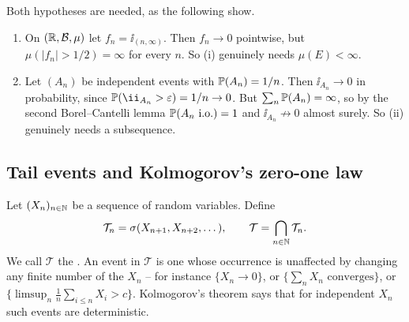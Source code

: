 \documentclass[a4paper]{scrartcl}
\newcommand{\cB}{\mathcal{B}}
\newcommand{\cT}{\mathcal{T}}
\newcommand{\ind}{\ii}
\begin{document}
Both hypotheses are needed, as the following show.

\begin{example}
	\begin{enumerate}[label=(\roman*)]
		\item On $(\R, \cB, \mu)$ let $f_n = \ind_{(n,\infty)}$. Then $f_n \to 0$ pointwise, but $\mu(|f_n| > 1/2) = \infty$ for every $n$. So (i) genuinely needs $\mu(E)<\infty$.
		\item Let $(A_n)$ be independent events with $\mathbb{P}(A_n)= 1/n$. Then $\ind_{A_n}\to 0$ in probability, since $\PP(\ind_{A_n} > \varepsilon) = 1/n \to 0$. But $\sum_n \mathbb{P}(A_n) = \infty$, so by the second Borel--Cantelli lemma $\mathbb{P}(A_n \text{ i.o.}) = 1$ and $\ind_{A_n} \not\to 0$ almost surely. So (ii) genuinely needs a subsequence.
	\end{enumerate}
\end{example}

\subsection{Tail events and Kolmogorov's zero-one law}

Let $(X_n)_{n \in \mathbb{N}}$ be a sequence of random variables. Define
$$
\cT_n = \sigma(X_{n+1}, X_{n+2}, \dots), \qquad \cT = \bigcap_{n \in \N}\cT_n.
$$
We call $\cT$ the . An event in $\cT$ is one whose occurrence is unaffected by changing any finite number of the $X_n$ -- for instance $\{X_n \to 0\}$, or $\{\sum_n X_n \text{ converges}\}$, or $\{\limsup_n \frac1n\sum_{i\leq n} X_i > c\}$. Kolmogorov's theorem says that for independent $X_n$ such events are deterministic.
\end{document}
